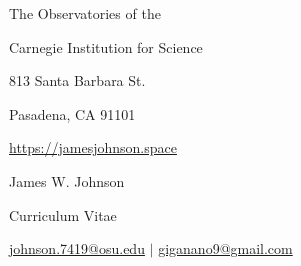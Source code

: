 \documentclass[cv.tex]{subfiles}
\begin{document}
\begin{center}
\parbox{.38\textwidth}{%
	\raggedleft%
	\vspace{-1.5cm}%
	The Observatories of the \par
	Carnegie Institution for Science \par
	813 Santa Barbara St. \par
	Pasadena, CA 91101 \par
	\url{https://jamesjohnson.space}%
}%
\hspace{4mm}%
\vrule height 2.0cm width 0.4pt%
\hspace{4mm}%
\parbox{.56\textwidth}{%
	{%
	\vspace{-1.5cm}%
	\fontsize{30}{36} \selectfont James W. Johnson \par
	\fontsize{20}{25} \selectfont Curriculum Vitae \par
	\fontsize{11}{13} \selectfont%
	\vspace{0.08cm}%
	\href{mailto:johnson.7419@osu.edu}{johnson.7419@osu.edu}%
	\hspace{3mm}%
	$\vert$%
	\hspace{3mm}%
	\href{mailto:giganano9@gmail.com}{giganano9@gmail.com}%
	}%
}%
\end{center}
\end{document}
